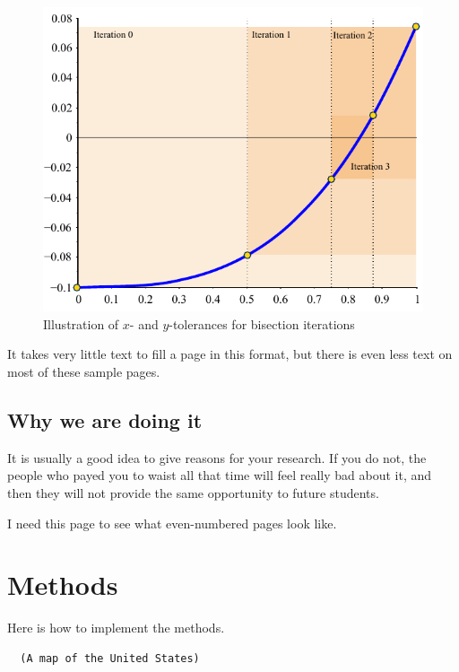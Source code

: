 \documentclass[thesis]{./tex/thesis-umich}
\begin{document}
\begin{figure}
 \begin{center}
  \includegraphics[scale=1]{./pics/f1_tol.pdf}
 \end{center}
 \caption{ \label{fig:fn:tol}
  Illustration of $x$- and $y$-tolerances for bisection iterations}
\end{figure}

\newpage

It takes very little text to fill a page in this format, but there is even less text on most of these sample pages.

\section{Why we are doing it}
It is usually a good idea to give reasons for your research.  If you do not, the people who payed you to waist all that time will feel really bad about it, and then they will not provide the same opportunity to future students.

\newpage

I need this page to see what even-numbered pages look like.

\appendix
\chapter{Methods}
Here is how to implement the methods.

\begin{program}
 \begin{verbatim}
  (A map of the United States)
 \end{verbatim}
 \caption{Map of the United States}
\end{program}
\end{document}
